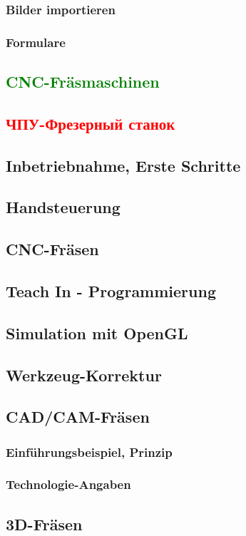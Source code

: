 \documentclass[14pt,a4paper]{book}
\newcommand{\DE}[1]{\textcolor{green}{#1}}
\newcommand{\RU}[1]{\textcolor{red}{#1}}
\begin{document}
		\subsection{Bilder importieren}
		\subsection{Formulare}
	 
\DE{\chapter{CNC-Fräsmaschinen}} 
\RU{\chapter{ЧПУ-Фрезерный станок}} 
	\section{Inbetriebnahme, Erste Schritte}
	\section{Handsteuerung}
	\section{CNC-Fräsen}
	\section{Teach In - Programmierung} 
	\section{Simulation mit OpenGL} 
	\section{Werkzeug-Korrektur} 
	\section{CAD/CAM-Fräsen} 
		\subsection{Einführungsbeispiel, Prinzip} 
		\subsection{Technologie-Angaben} 
	\section{3D-Fräsen}
\end{document}
